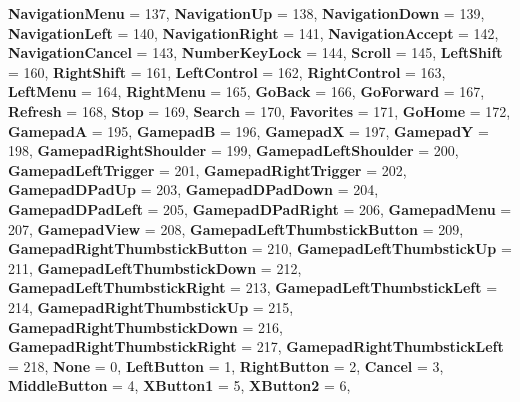 \begin{DoxyCompactItemize}
{\bfseries Navigation\+Menu} = 137, 
{\bfseries Navigation\+Up} = 138, 
{\bfseries Navigation\+Down} = 139, 
{\bfseries Navigation\+Left} = 140, 
\newline
{\bfseries Navigation\+Right} = 141, 
{\bfseries Navigation\+Accept} = 142, 
{\bfseries Navigation\+Cancel} = 143, 
{\bfseries Number\+Key\+Lock} = 144, 
\newline
{\bfseries Scroll} = 145, 
{\bfseries Left\+Shift} = 160, 
{\bfseries Right\+Shift} = 161, 
{\bfseries Left\+Control} = 162, 
\newline
{\bfseries Right\+Control} = 163, 
{\bfseries Left\+Menu} = 164, 
{\bfseries Right\+Menu} = 165, 
{\bfseries Go\+Back} = 166, 
\newline
{\bfseries Go\+Forward} = 167, 
{\bfseries Refresh} = 168, 
{\bfseries Stop} = 169, 
{\bfseries Search} = 170, 
\newline
{\bfseries Favorites} = 171, 
{\bfseries Go\+Home} = 172, 
{\bfseries GamepadA} = 195, 
{\bfseries GamepadB} = 196, 
\newline
{\bfseries GamepadX} = 197, 
{\bfseries GamepadY} = 198, 
{\bfseries Gamepad\+Right\+Shoulder} = 199, 
{\bfseries Gamepad\+Left\+Shoulder} = 200, 
\newline
{\bfseries Gamepad\+Left\+Trigger} = 201, 
{\bfseries Gamepad\+Right\+Trigger} = 202, 
{\bfseries Gamepad\+D\+Pad\+Up} = 203, 
{\bfseries Gamepad\+D\+Pad\+Down} = 204, 
\newline
{\bfseries Gamepad\+D\+Pad\+Left} = 205, 
{\bfseries Gamepad\+D\+Pad\+Right} = 206, 
{\bfseries Gamepad\+Menu} = 207, 
{\bfseries Gamepad\+View} = 208, 
\newline
{\bfseries Gamepad\+Left\+Thumbstick\+Button} = 209, 
{\bfseries Gamepad\+Right\+Thumbstick\+Button} = 210, 
{\bfseries Gamepad\+Left\+Thumbstick\+Up} = 211, 
{\bfseries Gamepad\+Left\+Thumbstick\+Down} = 212, 
\newline
{\bfseries Gamepad\+Left\+Thumbstick\+Right} = 213, 
{\bfseries Gamepad\+Left\+Thumbstick\+Left} = 214, 
{\bfseries Gamepad\+Right\+Thumbstick\+Up} = 215, 
{\bfseries Gamepad\+Right\+Thumbstick\+Down} = 216, 
\newline
{\bfseries Gamepad\+Right\+Thumbstick\+Right} = 217, 
{\bfseries Gamepad\+Right\+Thumbstick\+Left} = 218, 
{\bfseries None} = 0, 
{\bfseries Left\+Button} = 1, 
\newline
{\bfseries Right\+Button} = 2, 
{\bfseries Cancel} = 3, 
{\bfseries Middle\+Button} = 4, 
{\bfseries X\+Button1} = 5, 
\newline
{\bfseries X\+Button2} = 6, 

\end{DoxyCompactItemize}

